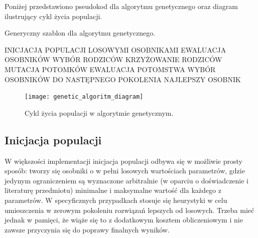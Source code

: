 \documentclass[a4paper,11pt]{article}
\begin{document}
    \bigskip

    \noindent
    \begin{minipage}[H]{\textwidth}
        \setlength\parindent{17pt} Poniżej przedstawiono pseudokod dla algorytmu genetycznego oraz diagram ilustrujący cykl życia populacji. \\
        \begin{algorithm}[H]
            \caption{Generyczny szablon dla algorytmu genetycznego\cite{IntroductionToEvolutionaryComputing2015}.}
            \label{alg:genetic_algorithm_template}
            \begin{algorithmic}
                \State INICJACJA POPULACJI LOSOWYMI OSOBNIKAMI
                \State EWALUACJA OSOBNIKÓW
                    \State WYBÓR RODZICÓW
                    \State KRZYŻOWANIE RODZICÓW
                    \State MUTACJA POTOMKÓW
                    \State EWALUACJA POTOMSTWA
                    \State WYBÓR OSOBNIKÓW DO NASTĘPNEGO POKOLENIA
                \EndWhile
                \State \Return NAJLEPSZY OSOBNIK
            \end{algorithmic}
        \end{algorithm}
    \end{minipage}

    \bigskip

    \begin{figure}[H]
        \label{fig:genetic_algoritm_diagram}
        \centering
        \texttt{[image: genetic\_algoritm\_diagram]}
        \caption{Cykl życia populacji w algorytmie genetycznym\cite{IntroductionToEvolutionaryComputing2015}.}
    \end{figure}

    \subsection{Inicjacja populacji}

    W większości implementacji inicjacja populacji odbywa się w możliwie prosty sposób: tworzy się osobniki o w pełni losowych wartościach parametrów, gdzie jedynym ograniczeniem są wyznaczone arbitralnie (w oparciu o doświadczenie i literaturę przedmiotu) minimalne i maksymalne wartość dla każdego z parametrów. W specyficznych przypadkach stosuje się heurystyki w celu umieszczenia w zerowym pokoleniu rozwiązań lepszych od losowych. Trzeba mieć jednak w pamięci, że wiąże się to z dodatkowym kosztem obliczeniowym i nie zawsze przyczynia się do poprawy finalnych wyników\cite{IntroductionToEvolutionaryComputing2015}.
\end{document}
